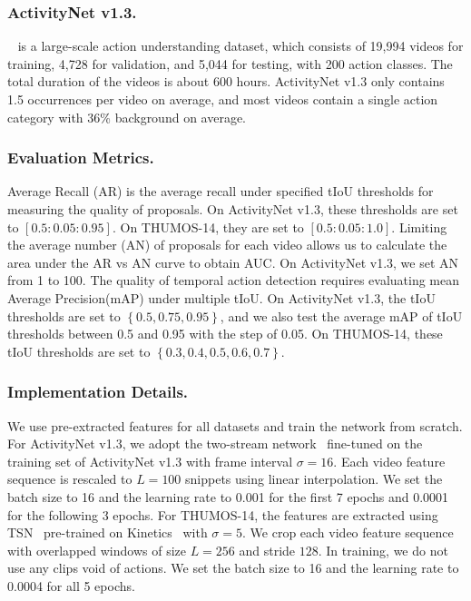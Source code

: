 \documentclass[letterpaper]{article} \usepackage{aaai22}  \usepackage{times}  \usepackage{helvet}  \usepackage{courier}  \usepackage[hyphens]{url}  \usepackage{graphicx} \urlstyle{rm} \def\UrlFont{\rm}  \usepackage{natbib}  \usepackage{caption} \DeclareCaptionStyle{ruled}{labelfont=normalfont,labelsep=colon,strut=off} \frenchspacing  \setlength{\pdfpagewidth}{8.5in}  \setlength{\pdfpageheight}{11in}  \usepackage{algorithm}
\begin{document}
\subsubsection{ActivityNet v1.3.}~\cite{anet} is a large-scale action understanding dataset, which consists of 19,994 videos for training, 4,728 for validation, and 5,044 for testing, with 200 action classes. The total duration of the videos is about 600 hours. ActivityNet v1.3 only contains 1.5 occurrences per video on average, and most videos contain a single action category with 36\% background on average.



\subsubsection{Evaluation Metrics.} Average Recall (AR) is the average recall under specified tIoU thresholds for measuring the quality of proposals. On ActivityNet v1.3, these thresholds are set to $\left[0.5:0.05:0.95\right]$. On THUMOS-14, they are set to $\left[0.5:0.05:1.0\right]$. Limiting the average number (AN) of proposals for each video allows us to calculate the area under the AR vs AN curve to obtain AUC. On ActivityNet v1.3, we set AN from 1 to 100. The quality of temporal action detection requires evaluating mean Average Precision(mAP) under multiple tIoU. On ActivityNet v1.3, the tIoU thresholds are set to $\left\{0.5,0.75,0.95\right\}$, and we also test the average mAP of tIoU thresholds between 0.5 and 0.95 with the step of 0.05. On THUMOS-14, these tIoU thresholds are set to $\left\{0.3,0.4,0.5,0.6,0.7\right\}$.






\subsubsection{Implementation Details.}
We use pre-extracted features for all datasets and train the network from scratch. For ActivityNet v1.3, we adopt the two-stream network~\cite{2stream_tsn} fine-tuned on the training set of ActivityNet v1.3 with frame interval $\sigma=16$. Each video feature sequence is rescaled to $L = 100$ snippets using linear interpolation. We set the batch size to 16 and the learning rate to 0.001 for the first 7 epochs and 0.0001 for the following 3 epochs. 
For THUMOS-14, the features are extracted using TSN~\cite{tsn} pre-trained on Kinetics~\cite{kinetics} with $\sigma=5$. We crop each video feature sequence with overlapped windows of size $L = 256$ and stride $128$. In training, we do not use any clips void of actions. We set the batch size to 16 and the learning rate to 0.0004 for all 5 epochs.
\end{document}
